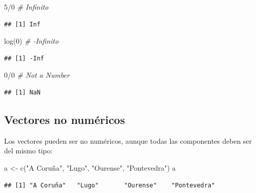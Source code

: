 \documentclass[
]{book}
\newenvironment{Shaded}{\begin{snugshade}}{\end{snugshade}}
\newcommand{\CommentTok}[1]{\textcolor[rgb]{0.56,0.35,0.01}{\textit{#1}}}
\newcommand{\DecValTok}[1]{\textcolor[rgb]{0.00,0.00,0.81}{#1}}
\newcommand{\FunctionTok}[1]{\textcolor[rgb]{0.00,0.00,0.00}{#1}}
\newcommand{\NormalTok}[1]{#1}
\newcommand{\OtherTok}[1]{\textcolor[rgb]{0.56,0.35,0.01}{#1}}
\newcommand{\SpecialCharTok}[1]{\textcolor[rgb]{0.00,0.00,0.00}{#1}}
\newcommand{\StringTok}[1]{\textcolor[rgb]{0.31,0.60,0.02}{#1}}
\theoremstyle{break}
\begin{document}
\begin{Shaded}
\begin{Highlighting}[]
\DecValTok{5}\SpecialCharTok{/}\DecValTok{0}  \CommentTok{\# Infinito}
\end{Highlighting}
\end{Shaded}

\begin{verbatim}
## [1] Inf
\end{verbatim}

\begin{Shaded}
\begin{Highlighting}[]
\FunctionTok{log}\NormalTok{(}\DecValTok{0}\NormalTok{)  }\CommentTok{\# {-}Infinito}
\end{Highlighting}
\end{Shaded}

\begin{verbatim}
## [1] -Inf
\end{verbatim}

\begin{Shaded}
\begin{Highlighting}[]
\DecValTok{0}\SpecialCharTok{/}\DecValTok{0}  \CommentTok{\# Not a Number}
\end{Highlighting}
\end{Shaded}

\begin{verbatim}
## [1] NaN
\end{verbatim}

\hypertarget{vectores-no-numuxe9ricos}{%
\subsection{Vectores no numéricos}\label{vectores-no-numuxe9ricos}}

Los vectores pueden ser no numéricos, aunque todas las componentes deben ser del mismo tipo:

\begin{Shaded}
\begin{Highlighting}[]
\NormalTok{a }\OtherTok{\textless{}{-}} \FunctionTok{c}\NormalTok{(}\StringTok{"A Coruña"}\NormalTok{, }\StringTok{"Lugo"}\NormalTok{, }\StringTok{"Ourense"}\NormalTok{, }\StringTok{"Pontevedra"}\NormalTok{)}
\NormalTok{a}
\end{Highlighting}
\end{Shaded}

\begin{verbatim}
## [1] "A Coruña"   "Lugo"       "Ourense"    "Pontevedra"
\end{verbatim}
\end{document}
